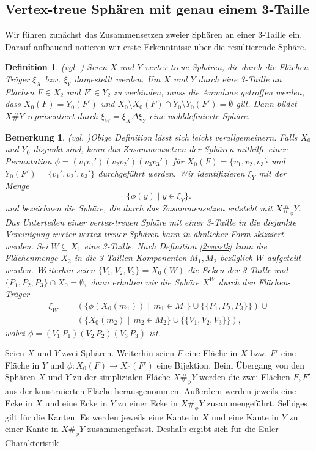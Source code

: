 \documentclass[12pt,titlepage,twoside,cleardoublepage]{article}
\theoremstyle{nummermitklammern}
\newtheorem{definition}[temp]{Definition}
\newtheorem{bemerkung}[temp]{Bemerkung}
\newtheorem{definition}[zahl]{Definition}
\newtheorem{bemerkung}[zahl]{Bemerkung}
\numberwithin{equation}{section}
\begin{document}
\subsection{Vertex-treue Sphären mit genau einem 3-Taille}
Wir führen zunächst das Zusammensetzen zweier Sphären an einer 3-Taille ein. Darauf aufbauend notieren wir erste Erkenntnisse über die resultierende Sphäre. 
\begin{definition}{\textsc{(}vgl. \textsc{\cite{simp})}}
Seien $X$ und $Y$ vertex-treue Sphären, die durch die Flächen-Träger $\xi_X$ bzw. $\xi_Y$ dargestellt werden. Um $X$ und $Y$ durch eine 3-Taille an Flächen $F\in X_2$ und $F'\in Y_2$ zu verbinden, muss die Annahme getroffen werden, dass
$X_0(F)=Y_0(F')$ und $X_0\setminus X_0(F)\cap Y_0\setminus Y_0(F')=\emptyset$ gilt. Dann bildet $X\#Y$ repräsentiert durch $\xi_W=\xi_X \Delta \xi_Y$ eine wohldefinierte Sphäre.
\end{definition}
\begin{bemerkung}{\textsc{(}vgl. \textsc{\cite{simp})}}\label{3waist}
Obige Definition lässt sich leicht verallgemeinern. Falls $X_0$ und $Y_0$ disjunkt sind, kann das Zusammensetzen der Sphären mithilfe einer Permutation $\phi=(v_1v_1')(v_2v_2')(v_3v_3')$ für $X_0(F)=\{v_1,v_2,v_3\}$ und $Y_0(F')=\{v_1',v_2',v_3'\}$ durchgeführt werden. Wir identifizieren $\xi_Y$ mit der Menge  
\[
\{\phi (y)\mid y\in \xi_Y \}.
\]
und bezeichnen die Sphäre, die durch das Zusammensetzen  entsteht mit $X\#_{\phi}Y.$\\
Das Unterteilen einer vertex-treuen Sphäre mit einer 3-Taille in die disjunkte Vereinigung zweier vertex-treuer Sphären kann in ähnlicher Form skizziert werden. Sei $W\subseteq X_1$ eine 3-Taille. Nach Definition \ref{2waistk} kann die Flächenmenge $X_2$ in die 3-Taillen Komponenten $M_1,M_2$ bezüglich $W$ aufgeteilt werden. Weiterhin seien $\{V_1,V_2,V_3\}=X_0(W)$ die Ecken der 3-Taille und $\{P_1,P_2,P_3\}\cap X_0=\emptyset,$ dann erhalten wir die Sphäre $X^W$ durch den Flächen-Träger 
\begin{align*}
\xi_W=&(\{\phi(X_0(m_1))\mid \, m_1\in M_1\}\cup \{\{P_1,P_2,P_3\}\}) \cup\\
 &(\{X_0(m_2)\mid \, m_2\in M_2\}\cup \{\{V_1,V_2,V_3\}\}),
\end{align*}
wobei $\phi=(V_1\,P_1)(V_2\,P_2)(V_3\,P_3)$ ist.
\end{bemerkung}
Seien $X$ und $Y$ zwei Sphären. Weiterhin seien  $F$ eine Fläche in $X$ bzw. $F'$ eine Fläche in $Y$ und $\phi :X_0(F)\to X_0(F')$ eine Bijektion. Beim Übergang von den Sphären $X$ und $Y$ zu der simplizialen Fläche $X\#_\phi Y$ werden die zwei Flächen $F,F'$ aus der konstruierten Fläche herausgenommen. Außerdem werden jeweils eine Ecke in $X$ und eine Ecke in $Y$ zu einer Ecke in $X\#_\phi Y$ zusammengeführt. Selbiges gilt für die Kanten. Es werden jeweils eine Kante in $X$ und eine Kante in $Y$ zu einer Kante in $X\#_\phi Y$ zusammengefasst. Deshalb ergibt sich für die Euler-Charakteristik
\end{document}
